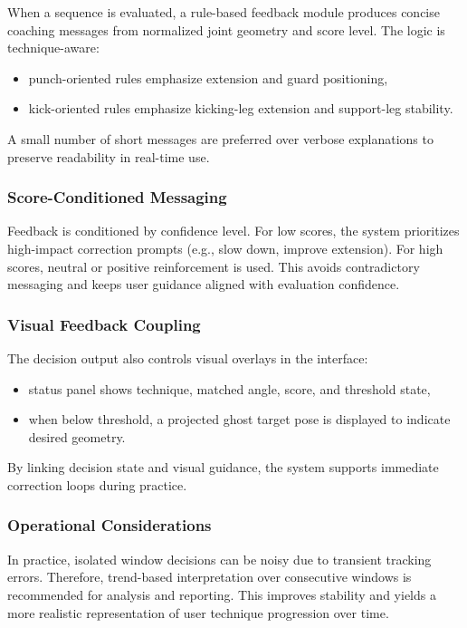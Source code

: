 \documentclass[12pt]{article}
\begin{document}
{When a sequence is evaluated, a rule-based feedback module produces concise coaching messages from normalized joint geometry and score level. The logic is technique-aware:

\begin{itemize}
    \item punch-oriented rules emphasize extension and guard positioning,
    \item kick-oriented rules emphasize kicking-leg extension and support-leg stability.
\end{itemize}

A small number of short messages are preferred over verbose explanations to preserve readability in real-time use.

\subsubsection{Score-Conditioned Messaging}

Feedback is conditioned by confidence level. For low scores, the system prioritizes high-impact correction prompts (e.g., slow down, improve extension). For high scores, neutral or positive reinforcement is used. This avoids contradictory messaging and keeps user guidance aligned with evaluation confidence.

\subsubsection{Visual Feedback Coupling}

The decision output also controls visual overlays in the interface:

\begin{itemize}
    \item status panel shows technique, matched angle, score, and threshold state,
    \item when below threshold, a projected ghost target pose is displayed to indicate desired geometry.
\end{itemize}

By linking decision state and visual guidance, the system supports immediate correction loops during practice.

\subsubsection{Operational Considerations}

In practice, isolated window decisions can be noisy due to transient tracking errors. Therefore, trend-based interpretation over consecutive windows is recommended for analysis and reporting. This improves stability and yields a more realistic representation of user technique progression over time.

}
\end{document}
